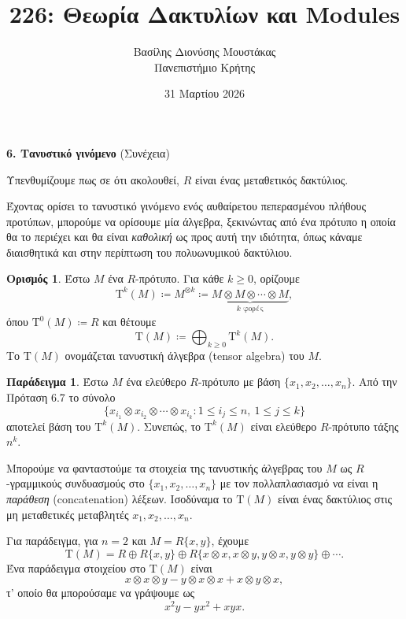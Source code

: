 \documentclass[12pt,a4paper,reqno]{amsart}
\title{226: Θεωρία Δακτυλίων και Modules}
\author[Β.~Δ. Μουστακας]{Βασίλης Διονύσης Μουστάκας \\ Πανεπιστήμιο Κρήτης}
\date{31 Μαρτίου 2026}
\theoremstyle{definition}
\newtheorem{definition}[theorem]{Ορισμός}
\newtheorem{example}[theorem]{Παράδειγμα}
\theoremstyle{remark}
\numberwithin{theorem}{section}
\numberwithin{exercise}{section}
\numberwithin{equation}{section}
\newcommand{\rmT}{\mathrm{T}}
\begin{document}
\begingroup
\def\uppercasenonmath#1{} %
\let\MakeUppercase\relax %
\maketitle
\endgroup

\setcounter{section}{6}
\setcounter{theorem}{11}
\setcounter{equation}{7}
\begin{center}
    \textbf{6. Τανυστικό γινόμενο
} (Συνέχεια)
\end{center}

Υπενθυμίζουμε πως σε ότι ακολουθεί, $R$ είναι ένας μεταθετικός δακτύλιος.

Έχοντας ορίσει το τανυστικό γινόμενο ενός αυθαίρετου πεπερασμένου πλήθους προτύπων, μπορούμε να ορίσουμε μία άλγεβρα, ξεκινώντας από ένα πρότυπο η οποία θα το περιέχει και θα είναι \emph{καθολική} ως προς αυτή την ιδιότητα, όπως κάναμε διαισθητικά και στην περίπτωση του πολυωνυμικού δακτύλιου.

\begin{definition}
    \label{def:tensor_algebra}
    Έστω $M$ ένα $R$-πρότυπο. Για κάθε $k \ge 0$, ορίζουμε 
    \[
    \rmT^k(M) \coloneqq M^{\otimes{k}} \coloneqq \underbrace{M\otimes M \otimes \cdots \otimes M}_{\text{$k$ φορές}},
    \]
    όπου $\rmT^0(M) \coloneqq R$ και θέτουμε 
    \[
    \rmT(M) \coloneqq \bigoplus_{k \ge 0} \rmT^k(M).
    \]
    Το $\rmT(M)$ ονομάζεται τανυστική άλγεβρα (tensor algebra) του $M$.
\end{definition}

\begin{example}
    \label{ex:tensor_algebra}
    Έστω $M$ ένα ελεύθερο $R$-πρότυπο με βάση $\{x_1, x_2, \dots, x_n\}$. Από την Πρόταση 6.7 το σύνολο 
    \[
    \{
        x_{i_1} \otimes x_{i_2} \otimes \cdots \otimes x_{i_k} : 1 \le i_j \le n, \ 1 \le j \le k
    \}
    \]
    αποτελεί βάση του $\rmT^k(M)$. Συνεπώς, το $\rmT^k(M)$ είναι ελεύθερο $R$-πρότυπο τάξης $n^k$. 

    Μπορούμε να φανταστούμε τα στοιχεία της τανυστικής άλγεβρας του $M$ ως $R$-γραμμι\-κούς συνδυασμούς  στο  $\{x_1, x_2, \dots, x_n\}$ με τον πολλαπλασιασμό να είναι η \emph{παράθεση} (concatenation) λέξεων. Ισοδύναμα το $\rmT(M)$ είναι ένας δακτύλιος  στις μη μεταθετικές μεταβλητές $x_1, x_2, \dots, x_n$.
    
    Για παράδειγμα, για $n=2$ και $M = R\{x,y\}$, έχουμε 
    \[
    \rmT(M) = R \oplus R\{x, y\} \oplus R\{x\otimes x, x\otimes y, y \otimes x, y \otimes y\} \oplus \cdots. 
    \]
    Ένα παράδειγμα στοιχείου στο $\rmT(M)$ είναι 
    \[
    x \otimes x \otimes y - y \otimes x \otimes x + x \otimes y \otimes x,
    \]
    τ' οποίο θα μπορούσαμε να γράψουμε ως 
    \[
    x^2y - yx^2 + xyx.
    \]
\end{example}
\end{document}

